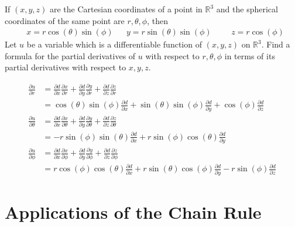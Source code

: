 \documentclass[12pt]{book}
\newcommand{\R}{\mathbb{R}}
\newenvironment{exercise}[2][Exercise]{\begin{trivlist}
\item[\hskip \labelsep {\bfseries #1}\hskip \labelsep {\bfseries #2.}]}{\end{trivlist}}
\begin{document}
\begin{exercise}{9.3.9}
	If $(x,y,z)$ are the Cartesian coordinates of a point in $\R^3$ and the spherical coordinates of the same point are $r, \theta, \phi$, then 
		\begin{align*} &x = r \cos(\theta) \sin(\phi)  &&y = r \sin(\theta) \sin(\phi) &&&z = r \cos(\phi) \end{align*}
	Let $u$ be a variable which is a differentiable  function of $(x,y,z)$ on $\R^3$. Find a formula for the partial derivatives of $u$ with respect to $r, \theta, \phi$ in terms of its partial derivatives with respect to $x,y,z$.

	\begin{align*}
	\frac{\partial u}{\partial r} &= \frac{\partial d}{\partial x} \frac{\partial x}{\partial r} + \frac{\partial d }{\partial y} \frac{\partial y}{\partial r} + \frac{\partial d}{\partial z} \frac{\partial z}{\partial r} \\
	&= \cos(\theta) \sin(\phi) \frac{\partial d}{\partial x} + \sin(\theta) \sin(\phi) \frac{\partial d}{\partial y} + \cos(\phi) \frac{\partial d}{\partial z} \\
	\frac{\partial u}{\partial \theta} &= \frac{\partial d}{\partial x} \frac{\partial x}{\partial \theta} + \frac{\partial d }{\partial y} \frac{\partial y}{\partial \theta} + \frac{\partial d}{\partial z} \frac{\partial z}{\partial \theta}\\
	&= - r \sin{\left (\phi \right )} \sin{\left (\theta \right )} \frac{\partial d}{\partial x} + r \sin{\left (\phi \right )} \cos{\left (\theta \right )} \frac{\partial d}{\partial y}  \\
	\frac{\partial u}{\partial \phi} &= \frac{\partial d}{\partial x} \frac{\partial x}{\partial \phi} + \frac{\partial d }{\partial y} \frac{\partial y}{\partial \phi} + \frac{\partial d}{\partial z} \frac{\partial z}{\partial \phi} \\
	&= r \cos{\left (\phi \right )} \cos{\left (\theta \right )} \frac{\partial d}{\partial x} + r \sin{\left (\theta \right )} \cos{\left (\phi \right )} \frac{\partial d}{\partial y} - r \sin{\left (\phi \right )} \frac{\partial d}{\partial z}
	\end{align*}
\end{exercise}




\section{Applications of the Chain Rule}
\end{document}

